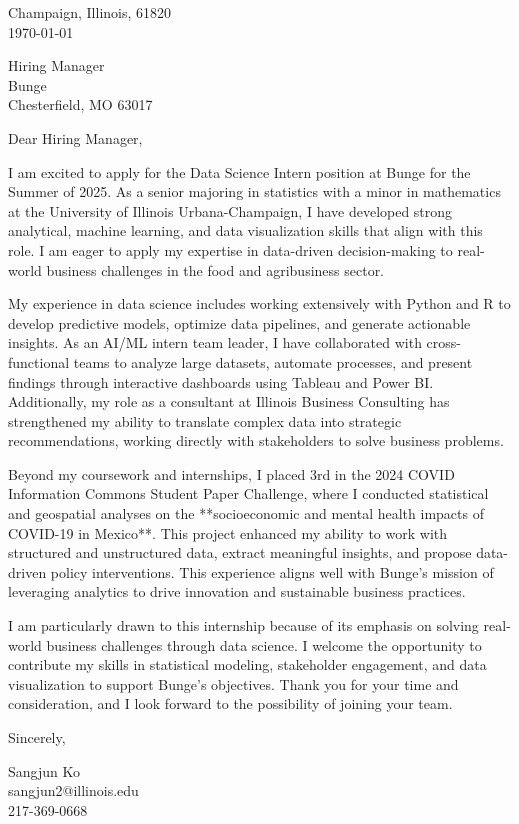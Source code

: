 \documentclass[11pt]{article}
\begin{document}
\noindent
Champaign, Illinois, 61820 \\
\today
\vspace{2em}

\noindent
Hiring Manager \\
Bunge \\
Chesterfield, MO 63017 \\

\vspace{1.5em}

Dear Hiring Manager,

I am excited to apply for the Data Science Intern position at Bunge for the Summer of 2025. As a senior majoring in statistics with a minor in mathematics at the University of Illinois Urbana-Champaign, I have developed strong analytical, machine learning, and data visualization skills that align with this role. I am eager to apply my expertise in data-driven decision-making to real-world business challenges in the food and agribusiness sector.

My experience in data science includes working extensively with Python and R to develop predictive models, optimize data pipelines, and generate actionable insights. As an AI/ML intern team leader, I have collaborated with cross-functional teams to analyze large datasets, automate processes, and present findings through interactive dashboards using Tableau and Power BI. Additionally, my role as a consultant at Illinois Business Consulting has strengthened my ability to translate complex data into strategic recommendations, working directly with stakeholders to solve business problems.

Beyond my coursework and internships, I placed 3rd in the 2024 COVID Information Commons Student Paper Challenge, where I conducted statistical and geospatial analyses on the **socioeconomic and mental health impacts of COVID-19 in Mexico**. This project enhanced my ability to work with structured and unstructured data, extract meaningful insights, and propose data-driven policy interventions. This experience aligns well with Bunge’s mission of leveraging analytics to drive innovation and sustainable business practices.

I am particularly drawn to this internship because of its emphasis on solving real-world business challenges through data science. I welcome the opportunity to contribute my skills in statistical modeling, stakeholder engagement, and data visualization to support Bunge’s objectives. Thank you for your time and consideration, and I look forward to the possibility of joining your team.

\vspace{1em}

Sincerely,

\vspace{2em}

\noindent
Sangjun Ko\\
sangjun2@illinois.edu\\
217-369-0668
\end{document}
